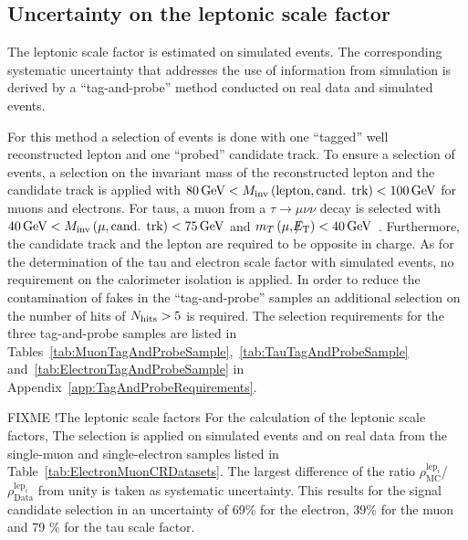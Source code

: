 \subsection{Uncertainty on the leptonic scale factor}
\label{sec:LeptonScaleUncertainty}

The leptonic scale factor \leptonscalefactor is estimated on simulated \WJets events.
The corresponding systematic uncertainty that addresses the use of information from simulation is derived by a ``tag-and-probe'' method conducted on real data and simulated events.

For this method a selection of \Zlep events is done with one ``tagged'' well reconstructed lepton and one ``probed'' candidate track.
To ensure a selection of \Zlep events, a selection on the invariant mass of  the reconstructed lepton and the candidate track is applied with $80\,\text{Ge}\kern-0.06667em\text{V}<M_{\text{inv}}\left( \text{lepton}, \text{cand. trk}  \right)<100\,\text{Ge}\kern-0.06667em\text{V}$ for muons and electrons.
For taus, a muon from a $\tau\rightarrow\mu\nu\nu$ decay is selected with $40\,\text{Ge}\kern-0.06667em\text{V}<M_{\text{inv}}\left( \mu, \text{cand. trk}  \right)<75\,\text{Ge}\kern-0.06667em\text{V}$ and $m_T\left(\mu,\slash\mkern-12mu{E}_{\text{T}}\right)<40\,\text{Ge}\kern-0.06667em\text{V}$~\cite{bib:CMS:DT_Thesis,bib:CMS:DT_8TeV_AN}.
Furthermore, the candidate track and the lepton are required to be opposite in charge.
As for the determination of the tau and electron scale factor with simulated \WJets events, no requirement on the calorimeter isolation is applied.
In order to reduce the contamination of fakes in the ``tag-and-probe'' samples an additional selection on the number of hits of $N_{\text{hits}}>5$ is required.
The selection requirements for the three tag-and-probe samples are listed in Tables~\ref{tab:MuonTagAndProbeSample},~\ref{tab:TauTagAndProbeSample} and~\ref{tab:ElectronTagAndProbeSample} in Appendix~\ref{app:TagAndProbeRequirements}.

FIXME !The leptonic scale factors For the calculation of the leptonic scale factors, 
The selection is applied on simulated \Zlep events and on real data from the single-muon and single-electron samples listed in Table~\ref{tab:ElectronMuonCRDatasets}.
The largest difference of the ratio $\rho^{\text{lep}_i}_{\text{MC}}$/$\rho^{\text{lep}_i}_{\text{Data}}$ from unity is taken as systematic uncertainty. 
This results for the signal candidate selection in an uncertainty of 69\% for the electron, 39\% for the muon and 79 \% for the tau scale factor.

